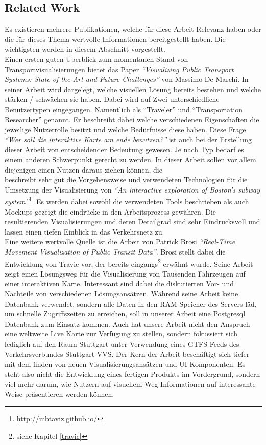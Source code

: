 \subsection{Related Work}
\label{sub:related_work}
  Es existieren mehrere Publikationen, welche für diese Arbeit Relevanz haben oder die für dieses Thema wertvolle Informationen bereitgestellt haben. Die wichtigsten werden in diesem Abschnitt vorgestellt.\\

  Einen ersten guten Überblick zum momentanen Stand von Transportvisualisierungen bietet das Paper \textit{"`Visualizing Public Transport Systems: State-of-the-Art and Future Challenges"'}\parencite{marchi} von Massimo De Marchi. In seiner Arbeit wird dargelegt, welche visuellen Lösung bereits bestehen und welche stärken / schwächen sie haben. Dabei wird auf Zwei unterschiedliche Benutzertypen eingegangen. Namentlich als "`Traveler"' und "`Transportation Researcher"' genannt. Er beschreibt dabei welche verschiedenen Eigenschaften die jeweilige Nutzerrolle besitzt und welche Bedürfnisse diese haben. Diese Frage \textit{"`Wer soll die interaktive Karte am ende benutzen?"'} ist auch bei der Erstellung dieser Arbeit von entscheidender Bedeutung gewesen. Je nach Typ bedarf es einem anderen Schwerpunkt gerecht zu werden. In dieser Arbeit sollen vor allem diejenigen einen Nutzen daraus ziehen können, die\\

  \parencite{mbtaviz} beschreibt sehr gut die Vorgehensweise und verwendeten Technologien für die Umsetzung der Visualisierung von \textit{"`An interactive exploration of Boston's subway system"'}\footnote{\url{http://mbtaviz.github.io/}}. Es werden dabei sowohl die verwendeten Tools beschrieben als auch Mockups gezeigt die eindrücke in den Arbeitsprozess gewähren. Die resultierenden Visualisierungen und deren Detailgrad sind sehr Eindrucksvoll und lassen einen tiefen Einblick in das Verkehrsnetz zu.\\

  Eine weitere wertvolle Quelle ist die Arbeit von Patrick Brosi \textit{"`Real-Time Movement Visualization of Public Transit Data"'}\parencite{brosi}. Brosi stellt dabei die Entwicklung von Travic vor, der bereits eingangs\footnote{siehe Kapitel \ref{travic}} erwähnt wurde. Seine Arbeit zeigt einen Lösungsweg für die Visualisierung von Tausenden Fahrzeugen auf einer interaktiven Karte. Interessant sind dabei die diskutierten Vor- und Nachteile von verschiedenen Lösungsansätzen.
  Während seine Arbeit keine Datenbank verwendet, sondern alle Daten in den RAM-Speicher des Servers läd, um schnelle Zugriffszeiten zu erreichen, soll in unserer Arbeit eine Postgresql Datenbank zum Einsatz kommen. 
  Auch hat unsere Arbeit nicht den Anspruch eine weltweite Live Karte zur Verfügung zu stellen, sondern fokussiert sich lediglich auf den Raum Stuttgart unter Verwendung eines GTFS Feeds des Verkehrsverbundes Stuttgart-VVS. 
  Der Kern der Arbeit beschäftigt sich tiefer mit dem finden von neuen Visualisierungsansätzen und UI-Komponenten. Es steht also nicht die Entwicklung eines fertigen Produkts im Vordergrund, sondern viel mehr darum, wie Nutzern auf visuellem Weg Informationen auf interessante Weise präsentieren werden können.

